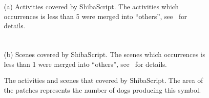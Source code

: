 \begin{figure}[ht]
(a) Activities covered by ShibaScript. The activities which occurrences is less than 5 were merged into ``others'', see~ for details.~\\
\\
\\
(b) Scenes covered by ShibaScript. The scenes which occurrences is less than 1 were merged into ``others'', see~ for details.
\caption{The activities and scenes that covered by ShibaScript. The area of the patches represents the number of dogs producing this symbol.}
\label{fig:scene_and_activity}
\end{figure}


